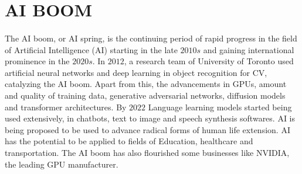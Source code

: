 \documentclass{article}
\begin{document}

















%
%
   



 \section{AI BOOM}  \cite{ai_boom}

\paragraph{}
	The AI boom, or AI spring, is the continuing period of rapid progress in the field of Artificial Intelligence (AI) starting in the late $2010s$ and gaining international prominence in the $2020s$.
	In $2012$, a research team of University of Toronto used artificial neural networks and deep learning in object recognition for CV, catalyzing the AI boom.
	Apart from this, the advancements in GPUs, amount and quality of training data, generative adversarial networks, diffusion models and transformer architectures.
	By $2022$ Language learning models started being used extensively, in chatbots, text to image and speech synthesis softwares.
	AI is being proposed to be used to advance radical forms of human life extension.
	AI has the potential to be applied to fields of Education, healthcare and transportation.
	The AI boom has also flourished some businesses like NVIDIA, the leading GPU manufacturer.
\end{document}

